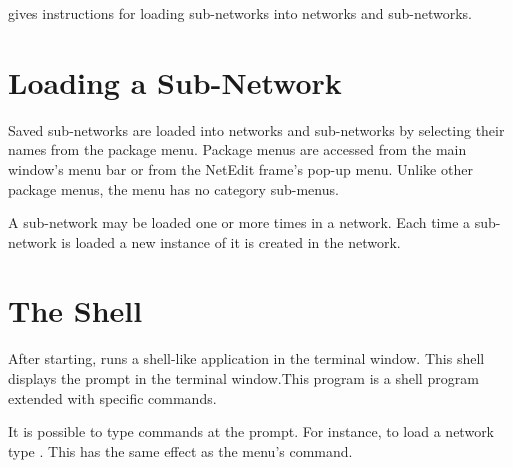  gives instructions for
loading sub-networks into networks and sub-networks.

\section{Loading a Sub-Network}
\label{sec:loadsubnet}

Saved sub-networks are loaded into networks and sub-networks by
selecting their names from the  package menu.
Package menus are accessed from the main window's menu bar or from the
NetEdit frame's pop-up menu.  Unlike other package menus, the
 menu has no category sub-menus.

A sub-network may be loaded one or more times in a network.  Each time
a sub-network is loaded a new instance of it is created in the
network.

\section{The \sr{} Shell}
\label{sec:termapp}

After starting, \sr{} runs a shell-like application in the terminal
window. This shell displays the prompt
 in the terminal window.This program is a
 shell program extended with
\sr{} specific commands.

It is possible to type \tcl{} \sr{} commands at the prompt.  For
instance, to load a network type .  This has the same effect as the 
menu's  command.
